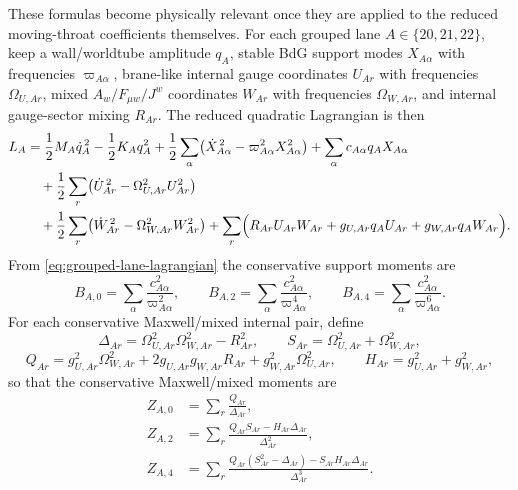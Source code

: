 \documentclass[11pt]{article}
\theoremstyle{definition}
\begin{document}
These formulas become physically relevant once they are applied to the reduced moving-throat coefficients themselves. For each grouped lane $A\in\{20,21,22\}$, keep a wall/worldtube amplitude $q_A$, stable BdG support modes $X_{A\alpha}$ with frequencies $\varpi_{A\alpha}$, brane-like internal gauge coordinates $U_{Ar}$ with frequencies $\Omega_{U,Ar}$, mixed $A_w/F_{\mu w}/J^w$ coordinates $W_{Ar}$ with frequencies $\Omega_{W,Ar}$, and internal gauge-sector mixing $R_{Ar}$. The reduced quadratic Lagrangian is then
\begin{align}
L_A
&=
\frac12 M_A\dot q_A^{\,2}-\frac12 K_A q_A^2
+\frac12\sum_{\alpha}\bigl(\dot X_{A\alpha}^{\,2}-\varpi_{A\alpha}^2 X_{A\alpha}^2\bigr)
+\sum_{\alpha} c_{A\alpha}q_A X_{A\alpha}
\nonumber\\
&\quad
+\frac12\sum_r\bigl(\dot U_{Ar}^{\,2}-\Omega_{U,Ar}^2U_{Ar}^2\bigr)
\nonumber\\
&\quad
+\frac12\sum_r\bigl(\dot W_{Ar}^{\,2}-\Omega_{W,Ar}^2W_{Ar}^2\bigr)
+\sum_r\Bigl(R_{Ar}U_{Ar}W_{Ar}+g_{U,Ar}q_AU_{Ar}+g_{W,Ar}q_AW_{Ar}\Bigr).
\label{eq:grouped-lane-lagrangian}
\end{align}
From \eqref{eq:grouped-lane-lagrangian} the conservative support moments are
\begin{equation}
B_{A,0}=\sum_{\alpha}\frac{c_{A\alpha}^2}{\varpi_{A\alpha}^2},
\qquad
B_{A,2}=\sum_{\alpha}\frac{c_{A\alpha}^2}{\varpi_{A\alpha}^4},
\qquad
B_{A,4}=\sum_{\alpha}\frac{c_{A\alpha}^2}{\varpi_{A\alpha}^6}.
\label{eq:grouped-B-moments}
\end{equation}
For each conservative Maxwell/mixed internal pair, define
\begin{equation}
\Delta_{Ar}=\Omega_{U,Ar}^2\Omega_{W,Ar}^2-R_{Ar}^2,
\qquad
S_{Ar}=\Omega_{U,Ar}^2+\Omega_{W,Ar}^2,
\label{eq:grouped-delta-S}
\end{equation}
\begin{equation}
Q_{Ar}=g_{U,Ar}^2\Omega_{W,Ar}^2+2g_{U,Ar}g_{W,Ar}R_{Ar}+g_{W,Ar}^2\Omega_{U,Ar}^2,
\qquad
H_{Ar}=g_{U,Ar}^2+g_{W,Ar}^2,
\label{eq:grouped-Q-H}
\end{equation}
so that the conservative Maxwell/mixed moments are
\begin{equation}
\begin{split}
Z_{A,0}&=\sum_r\frac{Q_{Ar}}{\Delta_{Ar}},\\
Z_{A,2}&=\sum_r\frac{Q_{Ar}S_{Ar}-H_{Ar}\Delta_{Ar}}{\Delta_{Ar}^2},\\
Z_{A,4}&=\sum_r\frac{Q_{Ar}(S_{Ar}^2-\Delta_{Ar})-S_{Ar}H_{Ar}\Delta_{Ar}}{\Delta_{Ar}^3}.
\end{split}
\label{eq:grouped-Z-moments}
\end{equation}
\end{document}
